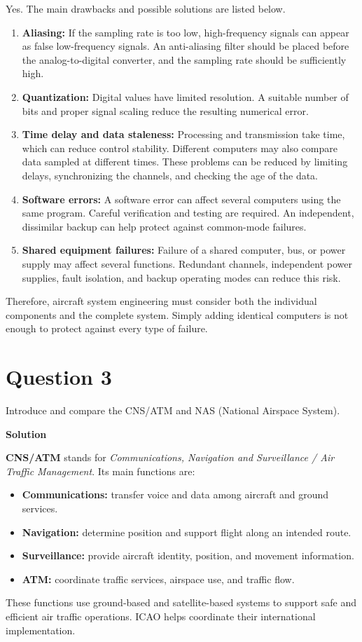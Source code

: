 \documentclass[12pt,a4paper]{article}
\begin{document}
Yes. The main drawbacks and possible solutions are listed below.
\begin{enumerate}
\item \textbf{Aliasing:} If the sampling rate is too low, high-frequency signals can
appear as false low-frequency signals. An anti-aliasing filter should be placed before
the analog-to-digital converter, and the sampling rate should be sufficiently high.
\item \textbf{Quantization:} Digital values have limited resolution. A suitable number
of bits and proper signal scaling reduce the resulting numerical error.
\item \textbf{Time delay and data staleness:} Processing and transmission take time,
which can reduce control stability. Different computers may also compare data sampled
at different times. These problems can be reduced by limiting delays, synchronizing
the channels, and checking the age of the data.
\item \textbf{Software errors:} A software error can affect several computers using
the same program. Careful verification and testing are required. An independent,
dissimilar backup can help protect against common-mode failures.
\item \textbf{Shared equipment failures:} Failure of a shared computer, bus, or power
supply may affect several functions. Redundant channels, independent power supplies,
fault isolation, and backup operating modes can reduce this risk.
\end{enumerate}
Therefore, aircraft system engineering must consider both the individual components
and the complete system. Simply adding identical computers is not enough to protect
against every type of failure.

\newpage
\section*{Question 3}
Introduce and compare the CNS/ATM and NAS (National Airspace System).

\textbf{Solution}

\textbf{CNS/ATM} stands for \emph{Communications, Navigation and Surveillance / Air
Traffic Management}. Its main functions are:
\begin{itemize}
\item \textbf{Communications:} transfer voice and data among aircraft and ground services.
\item \textbf{Navigation:} determine position and support flight along an intended route.
\item \textbf{Surveillance:} provide aircraft identity, position, and movement information.
\item \textbf{ATM:} coordinate traffic services, airspace use, and traffic flow.
\end{itemize}
These functions use ground-based and satellite-based systems to support safe and
efficient air traffic operations. ICAO helps coordinate their international
implementation.
\end{document}

